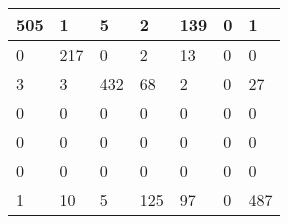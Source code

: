 \begin{tabular}{lllllll}
\hline
  505 & 1 & 5 & 2 & 139 & 0 & 1 \\
\hline
  0 & 217 & 0 & 2 & 13 & 0 & 0 \\
\hline
  3 & 3 & 432 & 68 & 2 & 0 & 27 \\
\hline
  0 & 0 & 0 & 0 & 0 & 0 & 0 \\
\hline
  0 & 0 & 0 & 0 & 0 & 0 & 0 \\
\hline
  0 & 0 & 0 & 0 & 0 & 0 & 0 \\
\hline
  1 & 10 & 5 & 125 & 97 & 0 & 487 \\
\hline
\end{tabular}
